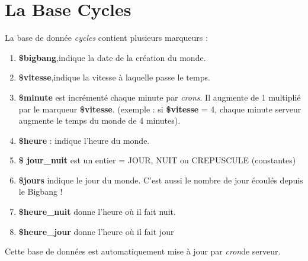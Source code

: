 \documentclass[french]{report}
\begin{document}
\section{La Base Cycles}\label{base_cycles}
La base de donnée \textit{cycles} contient plusieurs marqueurs : 
\begin{enumerate}
	\item  \textbf{\$bigbang},indique la date de la création du monde.
	\item  \textbf{\$vitesse},indique la vitesse à laquelle passe le temps.
	\item  \textbf{\$minute} est incrémenté chaque minute par \textit{crons}\footnotemark[1]. Il augmente de 1 multiplié par le marqueur  \textbf{\$vitesse}. (exemple : si \textbf{\$vitesse} = 4, chaque minute serveur augmente le temps du monde de 4 minutes).
	\item  \textbf{\$heure} : indique l'heure du monde.
	\item \textbf{\$ jour\_nuit} est un entier = JOUR, NUIT ou CREPUSCULE (constantes)
	\item \textbf{\$jours} indique le jour du monde. C'est aussi le nombre de jour écoulés depuis le Bigbang !
	\item \textbf{\$heure\_nuit} donne l'heure où il fait nuit.
	\item \textbf{\$heure\_jour} donne l'heure où il fait jour
\end{enumerate}
Cette base de données est automatiquement mise à jour par \textit{cron}\footnotemark[1] de serveur.\\

\end{document}
